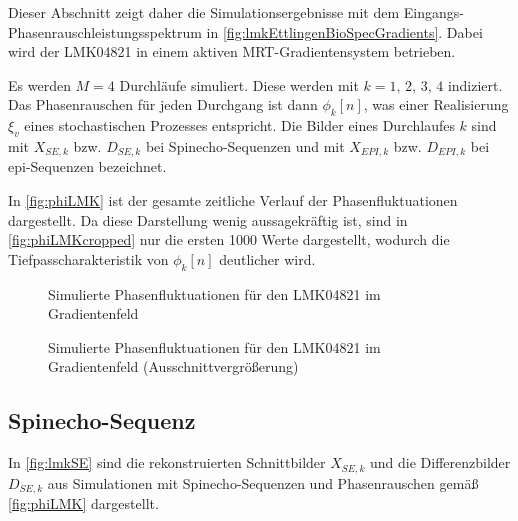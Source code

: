 Dieser Abschnitt zeigt daher die Simulationsergebnisse mit dem Eingangs-Phasen\-rausch\-leistungs\-spektrum in \autoref{fig:lmkEttlingenBioSpecGradients}. Dabei wird der LMK04821 in einem aktiven MRT-Gradientensystem betrieben.

Es werden $M=4$ Durchläufe simuliert. Diese werden mit $k=1,\,2,\,3,\,4$ indiziert. Das Phasenrauschen für jeden Durchgang ist dann $\phi_k[n]$, was einer Realisierung $\xi_v$ eines stochastischen Prozesses entspricht. Die Bilder eines Durchlaufes $k$ sind mit $X_{SE,k}$ bzw. $D_{SE,k}$ bei Spinecho-Sequenzen und mit $X_{EPI,k}$ bzw. $D_{EPI,k}$ bei \gls{epi}-Sequenzen bezeichnet.

In \autoref{fig:phiLMK} ist der gesamte zeitliche Verlauf der Phasenfluktuationen dargestellt. Da diese Darstellung wenig aussagekräftig ist, sind in \autoref{fig:phiLMKcropped} nur die ersten 1000 Werte dargestellt, wodurch die Tiefpasscharakteristik von $\phi_k[n]$ deutlicher wird.

\begin{figure}[H]
	\centering
	\caption[Simulierte Phasenfluktuationen (LMK04821 in Gradientenfeld)]{Simulierte Phasenfluktuationen für den LMK04821 im Gradientenfeld}
	\label{fig:phiLMK}
\end{figure}

\begin{figure}[H]
	\centering
	\caption[Simulierte Phasenfluktuationen (LMK04821 in Gradientenfeld) (Vergrößerung)]{Simulierte Phasenfluktuationen für den LMK04821 im Gradientenfeld (Ausschnittvergrößerung)}
	\label{fig:phiLMKcropped}
\end{figure}

\clearpage
\subsection{Spinecho-Sequenz}
In \autoref{fig:lmkSE} sind die rekonstruierten Schnittbilder $X_{SE,k}$ und die Differenzbilder $D_{SE,k}$ aus Simulationen mit Spinecho-Sequenzen und Phasenrauschen gemäß \autoref{fig:phiLMK} dargestellt.

